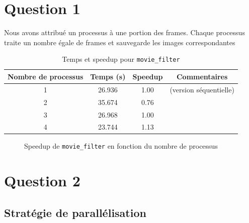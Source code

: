 \documentclass[a4paper,13pt]{book}
\begin{document}
\section{Question 1}

Nous avons attribué un processus à une portion des frames. Chaque processus traite un nombre égale de frames et sauvegarde les images correspondantes
\begin{table}[h!]
    \centering
    \caption{Temps et speedup pour \texttt{movie\_filter}}
    \label{tab:movie_filter}
    \begin{tabular}{@{}cccc@{}}
    \toprule
    \textbf{Nombre de processus} & \textbf{Temps (s)} & \textbf{Speedup} & \textbf{Commentaires}\\
    \midrule
    1 & 26.936 & 1.00 & (version séquentielle)\\
    2 & 35.674 & 0.76 & \\
    3 & 26.968 & 1.00 & \\
    4 & 23.744 & 1.13 & \\
    \bottomrule
    \end{tabular}
    \end{table}
    
    \begin{figure}[h!]
    \centering
    \caption{Speedup de \texttt{movie\_filter} en fonction du nombre de processus}
    \label{fig:movie_filter_speedup}
    \end{figure}
\section{Question 2}
\subsection{ Stratégie de parallélisation}
\end{document}
